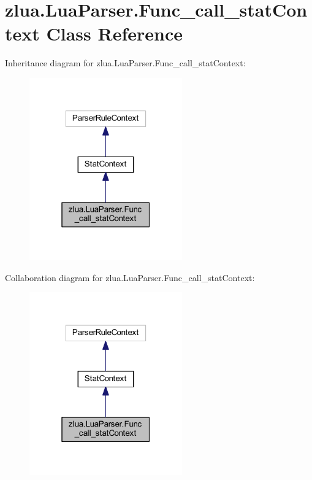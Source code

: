 \hypertarget{classzlua_1_1_lua_parser_1_1_func__call__stat_context}{}\section{zlua.\+Lua\+Parser.\+Func\+\_\+call\+\_\+stat\+Context Class Reference}
\label{classzlua_1_1_lua_parser_1_1_func__call__stat_context}


Inheritance diagram for zlua.\+Lua\+Parser.\+Func\+\_\+call\+\_\+stat\+Context\+:
\nopagebreak
\begin{figure}[H]
\begin{center}
\leavevmode
\includegraphics[width=187pt]{classzlua_1_1_lua_parser_1_1_func__call__stat_context__inherit__graph}
\end{center}
\end{figure}


Collaboration diagram for zlua.\+Lua\+Parser.\+Func\+\_\+call\+\_\+stat\+Context\+:
\nopagebreak
\begin{figure}[H]
\begin{center}
\leavevmode
\includegraphics[width=187pt]{classzlua_1_1_lua_parser_1_1_func__call__stat_context__coll__graph}
\end{center}
\end{figure}
